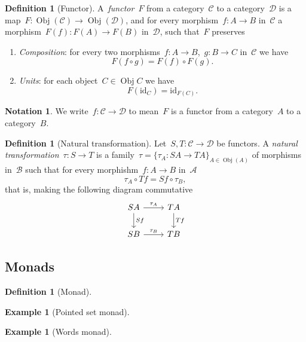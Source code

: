 \documentclass[a4paper]{article}
\theoremstyle{plain}
\newtheorem{example}[theorem]{Example}
\theoremstyle{definition}
\newtheorem{definition}[theorem]{Definition}
\newtheorem{notation}[theorem]{Notation}
\DeclareMathOperator{\Obj}{Obj}
\newcommand{\id}{\mathrm{id}}
\newcommand{\cat}[1]{\mathcal{#1}}
\begin{document}
\begin{definition}[Functor]
    \label{def:functor}
    A~\emph{functor}~\(F\) from a category~\(\cat{C}\) to a category~\(\cat{D}\)
    is a map~\(F:\Obj(\cat{C})\longrightarrow\Obj(\cat{D})\), and for every
    morphism~\(f:A\longrightarrow B\) in~\(\cat{C}\) a
    morphism~\(F(f):F(A)\longrightarrow F(B)\) in~\(\cat{D}\), such that~\(F\)
    preserves
    \begin{enumerate}
        \item \emph{Composition}: for every two
            morphisms~\(f:A\longrightarrow B\),~\(g:B\longrightarrow C\)
            in~\(\cat{C}\) we have
            \[
                F(f \circ g) = F(f) \circ F(g).
            \]
        \item \emph{Units}: for each object~\(C\in\Obj{C}\) we have
            \[
                F(\id_{C}) = \id_{F(C)}.
            \]
    \end{enumerate}
\end{definition}

\begin{notation}
    We write~\(f:\cat{C}\longrightarrow\cat{D}\) to mean~\(F\) is a functor from
    a category~\(A\) to a category~\(B\).
\end{notation}

\begin{definition}[Natural transformation]
    \label{def:natural-transformation}
    Let~\(S,T:\cat{C}\longrightarrow\cat{D}\) be functors. A \emph{natural
    transformation}~\(\tau:S\longrightarrow T\) is a
    family~\(\tau=\{\tau_{A}:SA\longrightarrow TA\}_{A\in\Obj(A)}\) of morphisms
    in~\(\cat{B}\) such that for every morphishm~\(f:A\longrightarrow B\)
    in~\(\cat{A}\)
    \[
        \tau_{A} \circ Tf = Sf \circ \tau_{B},
    \]
    that is, making the following diagram commutative
    \[
        \begin{tikzcd}
            SA \arrow[r, "\tau_{A}"] \arrow[d, "Sf"] & TA \arrow[d, "Tf"] \\
            SB \arrow[r, "\tau_{B}"] & TB
        \end{tikzcd}
    \]
\end{definition}

\subsection{Monads}
\begin{definition}[Monad]
\end{definition}
\begin{example}[Pointed set monad]
\end{example}
\begin{example}[Words monad]
\end{example}
\end{document}
